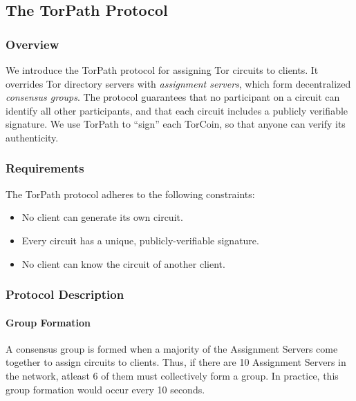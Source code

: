 \subsection{The TorPath Protocol}

\subsubsection{Overview}

We introduce the TorPath protocol for assigning Tor circuits to clients. It
overrides Tor directory servers with \textit{assignment servers}, which form
decentralized \textit{consensus groups}. The protocol guarantees that no
participant on a circuit can identify all other participants, and that each
circuit includes a publicly verifiable signature. We use TorPath to ``sign''
each TorCoin, so that anyone can verify its authenticity.

\subsubsection{Requirements}

The TorPath protocol adheres to the following constraints:

\begin{itemize}   
\item No client can generate its own circuit.   
\item Every circuit has a unique, publicly-verifiable signature.   
\item No client can know the circuit of another client. 
\end{itemize}

\subsubsection{Protocol Description}

\paragraph{Group Formation}

A consensus group is formed when a majority of the Assignment Servers come
together to assign circuits to clients. Thus, if there are 10 Assignment Servers
in the network, atleast 6 of them must collectively form a group. In practice, 
this group formation would occur every 10 seconds.

